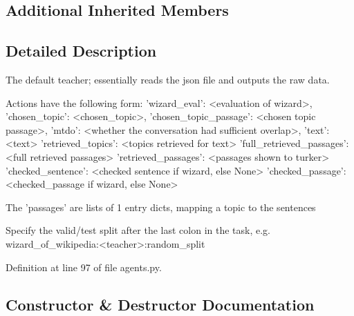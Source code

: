 \subsection*{Additional Inherited Members}


\subsection{Detailed Description}
\begin{DoxyVerb}The default teacher; essentially reads the json file and outputs the
   raw data.

   Actions have the following form:
   {
       'wizard_eval': <evaluation of wizard>,
       'chosen_topic': <chosen_topic>,
       'chosen_topic_passage': <chosen topic passage>,
       'mtdo': <whether the conversation had sufficient overlap>,
       'text': <text>
       'retrieved_topics': <topics retrieved for text>
       'full_retrieved_passages': <full retrieved passages>
       'retrieved_passages': <passages shown to turker>
       'checked_sentence': <checked sentence if wizard, else None>
       'checked_passage': <checked_passage if wizard, else None>
   }

   The 'passages' are lists of 1 entry dicts, mapping a topic to the sentences

   Specify the valid/test split after the last colon in the task, e.g.
   wizard_of_wikipedia:<teacher>:random_split
\end{DoxyVerb}
 

Definition at line 97 of file agents.\+py.



\subsection{Constructor \& Destructor Documentation}
\mbox{\label{classparlai_1_1tasks_1_1wizard__of__wikipedia_1_1agents_1_1WizardOfWikipediaTeacher_a364b2b8db4fd8162bd72d29fe4001d90}} 
